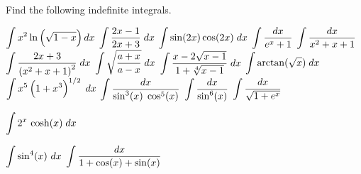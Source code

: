 
\begin{Exercise} Find the following indefinite integrals.
	\begin{multicols}{2}
		\Question[difficulty = 2] $\displaystyle \int x^2\ln\left(\sqrt{1-x}\right)dx$
		\Question[difficulty = 1] $\displaystyle \int\dfrac{2x-1}{2x+3}\;dx$
		\Question[difficulty = 1] $\displaystyle \int \sin(2x)\cos(2x)\;dx$
		\Question[difficulty = 2] $\displaystyle \int\dfrac{dx}{e^x+1}$
		\Question[difficulty = 1] $\displaystyle \int\dfrac{dx}{x^2+x+1}$
		\Question[difficulty = 2] $\displaystyle \int\dfrac{2x+3}{\left(x^2+x+1\right)^2}\;dx$
		\Question[difficulty = 3] $\displaystyle \int\sqrt{\dfrac{a+x}{a-x}}\;dx$
		\Question[difficulty = 2] $\displaystyle \int\dfrac{x-2\sqrt{x-1}}{1+\sqrt[4]{x-1}}\;dx$
		\ifanalysis\Question[difficulty = 1]\fi\ifcalculus\Question[difficulty = 2]\fi $\displaystyle \int \arctan (\sqrt{x}) \;dx$
		\ifanalysis\Question[difficulty = 1]\fi\ifcalculus\Question[difficulty = 2]\fi $\displaystyle \int x^5\left(1+x^3\right)^{1/2}\;dx$
		\ifanalysis\Question[difficulty = 2]\fi\ifcalculus\Question[difficulty = 3]\fi $\displaystyle \int\dfrac{dx}{\sin^3 (x)\;\cos^5 (x)}$
		\Question[difficulty = 2] $\displaystyle \int\dfrac{dx}{\sin^6 (x)}$
		\Question[difficulty = 1] $\displaystyle \int\dfrac{dx}{\sqrt{1+e^x}}$
		
		\ifanalysis
		\Question[difficulty = 1] $\displaystyle \int 2^x\,\cosh (x)\;dx$
		\fi
 
		\Question[difficulty = 2] $\displaystyle \int \sin^4 (x) \ dx $
		\Question[difficulty = 3] $\displaystyle \int \dfrac{dx}{1 + \cos(x) + \sin(x)}$
		\EndCurrentQuestion
	\end{multicols}
\end{Exercise}

